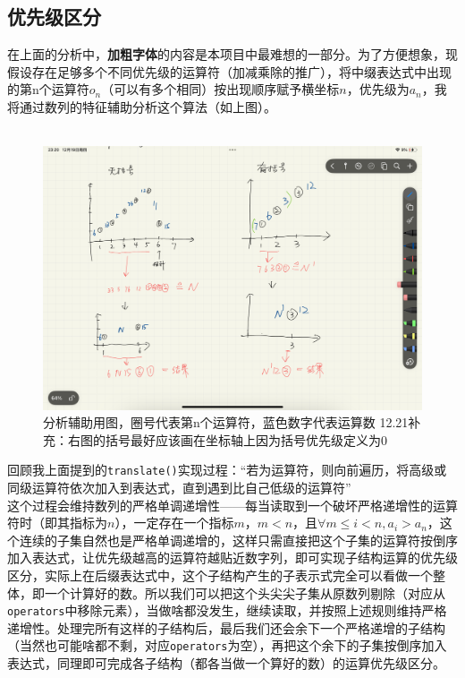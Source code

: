 \documentclass[UTF8]{ctexart}
\begin{document}
\subsection{优先级区分}
在上面的分析中，\textbf{加粗字体}的内容是本项目中最难想的一部分。为了方便想象，现假设存在足够多个不同优先级的运算符（加减乘除的推广），将中缀表达式中出现的第n个运算符$o_n$（可以有多个相同）按出现顺序赋予横坐标$n$，优先级为$a_n$，我将通过数列的特征辅助分析这个算法（如上图）。\\\\
\begin{figure}
    \centering
    \includegraphics[width=0.5\linewidth]{analysis_figure.PNG}
    \caption{分析辅助用图，圈号代表第n个运算符，蓝色数字代表运算数     12.21补充：右图的括号最好应该画在坐标轴上因为括号优先级定义为0}
    \label{fig:enter-label}
\end{figure}
回顾我上面提到的\verb|translate()|实现过程：“若为运算符，则向前遍历，将高级或同级运算符依次加入到表达式，直到遇到比自己低级的运算符”\\
这个过程会维持数列的严格单调递增性——每当读取到一个破坏严格递增性的运算符时（即其指标为$n$），一定存在一个指标$m$，$m<n$，且$\forall m\leq i<n,a_i>a_n$，这个连续的子集自然也是严格单调递增的，这样只需直接把这个子集的运算符按倒序加入表达式，让优先级越高的运算符越贴近数字列，即可实现子结构运算的优先级区分，实际上在后缀表达式中，这个子结构产生的子表示式完全可以看做一个整体，即一个计算好的数。所以我们可以把这个头尖尖子集从原数列剔除（对应从\verb|operators|中移除元素），当做啥都没发生，继续读取，并按照上述规则维持严格递增性。处理完所有这样的子结构后，最后我们还会余下一个严格递增的子结构（当然也可能啥都不剩，对应\verb|operators|为空），再把这个余下的子集按倒序加入表达式，同理即可完成各子结构（都各当做一个算好的数）的运算优先级区分。\\\\
\end{document}

